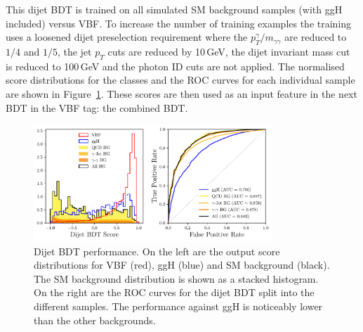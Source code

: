 This dijet BDT is trained on all simulated SM background samples (with ggH included) versus VBF. To increase the number of training examples the training uses a loosened dijet preselection requirement where the $p_{T}^{\gamma}/m_{\gamma\gamma}$ are reduced to $1/4$ and $1/5$, the jet $p_T$ cuts are reduced by 10\,GeV, the dijet invariant mass cut is reduced to 100\,GeV and the photon ID cuts are not applied.
The normalised score distributions for the classes and the ROC curves for each individual sample are shown in Figure~\ref{fig:event_categorisaton:dijet_bdt_performance}.
These scores are then used as an input feature in the next BDT in the VBF tag: the combined BDT. 
\begin{figure}[h!]
    \centering
        \includegraphics[width=0.8\textwidth]{figures/event_selection/dijet_BDT_PS.pdf}
    \caption{Dijet BDT performance. On the left are the output score distributions for VBF (red), ggH (blue) and SM background (black). The SM background distribution is shown as a stacked histogram. On the right are the ROC curves for the dijet BDT split into the different samples. The performance against ggH is noticeably lower than the other backgrounds.}
    \label{fig:event_categorisaton:dijet_bdt_performance}
\end{figure}










